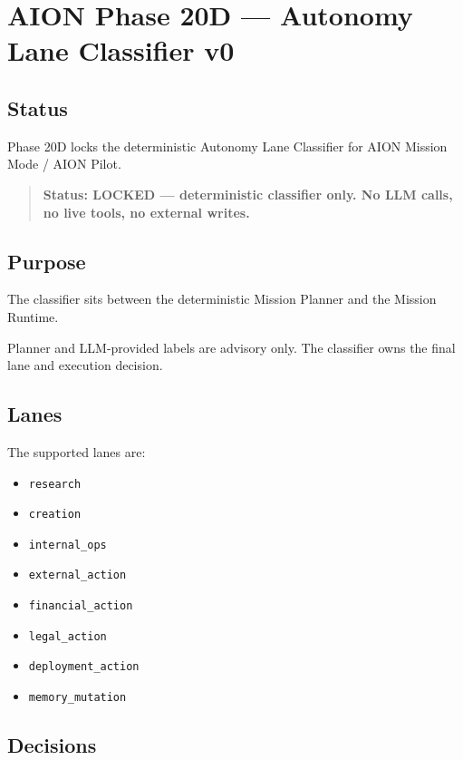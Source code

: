 \section{AION Phase 20D --- Autonomy Lane Classifier v0}
\label{sec:aion-phase20d-autonomy-lane-classifier-lock}

\subsection{Status}

Phase 20D locks the deterministic Autonomy Lane Classifier for AION Mission Mode / AION Pilot.

\begin{quote}
\textbf{Status: LOCKED --- deterministic classifier only. No LLM calls, no live tools, no external writes.}
\end{quote}

\subsection{Purpose}

The classifier sits between the deterministic Mission Planner and the Mission Runtime.

Planner and LLM-provided labels are advisory only. The classifier owns the final lane and execution decision.

\subsection{Lanes}

The supported lanes are:

\begin{itemize}
  \item \texttt{research}
  \item \texttt{creation}
  \item \texttt{internal\_ops}
  \item \texttt{external\_action}
  \item \texttt{financial\_action}
  \item \texttt{legal\_action}
  \item \texttt{deployment\_action}
  \item \texttt{memory\_mutation}
\end{itemize}

\subsection{Decisions}

